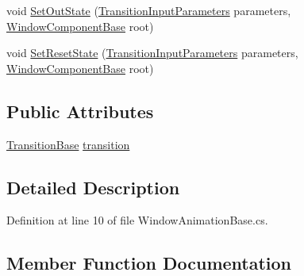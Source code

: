 \begin{DoxyCompactItemize}
\item 
void \hyperlink{class_unity_engine_1_1_u_i_1_1_windows_1_1_animations_1_1_window_animation_base_1_1_transition_a05e43f0688271312e68deb7608502df9}{Set\+Out\+State} (\hyperlink{class_unity_engine_1_1_u_i_1_1_windows_1_1_animations_1_1_transition_input_parameters}{Transition\+Input\+Parameters} parameters, \hyperlink{class_unity_engine_1_1_u_i_1_1_windows_1_1_window_component_base}{Window\+Component\+Base} root)
\item 
void \hyperlink{class_unity_engine_1_1_u_i_1_1_windows_1_1_animations_1_1_window_animation_base_1_1_transition_a30db1c3d24348085bfc4ceed608010e0}{Set\+Reset\+State} (\hyperlink{class_unity_engine_1_1_u_i_1_1_windows_1_1_animations_1_1_transition_input_parameters}{Transition\+Input\+Parameters} parameters, \hyperlink{class_unity_engine_1_1_u_i_1_1_windows_1_1_window_component_base}{Window\+Component\+Base} root)
\end{DoxyCompactItemize}
\subsection*{Public Attributes}
\begin{DoxyCompactItemize}
\item 
\hyperlink{class_unity_engine_1_1_u_i_1_1_windows_1_1_animations_1_1_transition_base}{Transition\+Base} \hyperlink{class_unity_engine_1_1_u_i_1_1_windows_1_1_animations_1_1_window_animation_base_1_1_transition_a4d72f5859978d8413d53927e987cb69b}{transition}
\end{DoxyCompactItemize}


\subsection{Detailed Description}


Definition at line 10 of file Window\+Animation\+Base.\+cs.



\subsection{Member Function Documentation}
\hypertarget{class_unity_engine_1_1_u_i_1_1_windows_1_1_animations_1_1_window_animation_base_1_1_transition_ab1c3a85d48dbaf3f6b8b124c7e94c62c}{}
